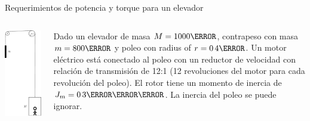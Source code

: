 \documentclass[presentation,aspectratio=169]{beamer}
\begin{document}
\begin{frame}[label={sec:org0ac4a5b}]{Requerimientos de potencia y torque para un elevador}
\begin{columns}
\begin{column}{0.38\columnwidth}
\begin{center}
\includegraphics[height=0.8\textheight]{../../figures/mech-elevator}
\end{center}
\end{column}

\begin{column}{0.72\columnwidth}
Dado un elevador de masa \(M=\unit{1000}{\kilogram}\), contrapeso con masa \(m=\unit{800}{\kilogram}\) y poleo con radius of \(r=\unit{0.4}{\meter}\). Un motor eléctrico está conectado al poleo con un reductor de velocidad con relación de transmisión de 12:1 (12 revoluciones del motor para cada revolución del poleo). El rotor tiene un momento de inercia de \(J_m = \unit{0.3}{\kilogram\meter\squared}\). La inercia del poleo se puede ignorar.


\end{column}
\end{columns}
\end{frame}
\end{document}
